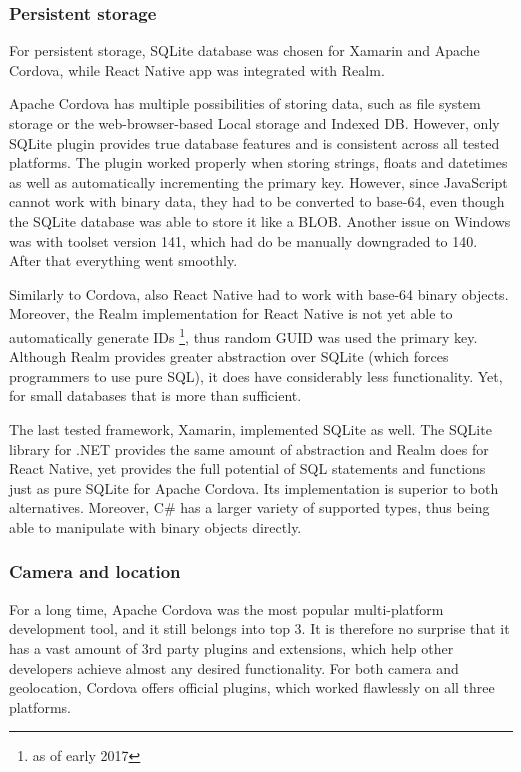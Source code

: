 \documentclass[english,master,public,dept460,male,cpdeclaration,oneside]{diploma}
\begin{document}
\subsubsection{Persistent storage}
For persistent storage, SQLite database was chosen for Xamarin and Apache Cordova, while React Native app was integrated with Realm. 

Apache Cordova has multiple possibilities of storing data, such as file system storage or the web-browser-based Local storage and Indexed DB. However, only SQLite plugin provides true database features and is consistent across all tested platforms. The plugin worked properly when storing strings, floats and datetimes as well as automatically incrementing the primary key. However, since JavaScript cannot work with binary data, they had to be converted to base-64, even though the SQLite database was able to store it like a BLOB. Another issue on Windows was with toolset version 141, which had do be manually downgraded to 140. After that everything went smoothly.

Similarly to Cordova, also React Native had to work with base-64 binary objects. Moreover, the Realm implementation for React Native is not yet able to automatically generate IDs \footnote{as of early 2017}, thus random GUID was used the primary key. Although Realm provides greater abstraction over SQLite (which forces programmers to use pure SQL), it does have considerably less functionality. Yet, for small databases that is more than sufficient.

The last tested framework, Xamarin, implemented SQLite as well. The SQLite library for .NET provides the same amount of abstraction and Realm does for React Native, yet provides the full potential of SQL statements and functions just as pure SQLite for Apache Cordova. Its implementation is superior to both alternatives. Moreover, C\# has a larger variety of supported types, thus being able to manipulate with binary objects directly.

\subsubsection{Camera and location}
For a long time, Apache Cordova was the most popular multi-platform development tool, and it still belongs into top 3. It is therefore no surprise that it has a vast amount of 3rd party plugins and extensions, which help other developers achieve almost any desired functionality. For both camera and geolocation, Cordova offers official plugins, which worked flawlessly on all three platforms.
\end{document}
